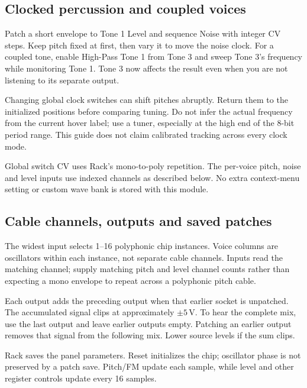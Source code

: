 \subsection{Clocked percussion and coupled voices}
Patch a short envelope to Tone 1 Level and sequence Noise with integer CV
steps. Keep pitch fixed at first, then vary it to move the noise clock.
For a coupled tone, enable High-Pass Tone 1 from Tone 3 and sweep Tone 3's
frequency while monitoring Tone 1. Tone 3 now affects the result even when
you are not listening to its separate output.

Changing global clock switches can shift pitches abruptly. Return them to
the initialized positions before comparing tuning. Do not infer the actual
frequency from the current hover label; use a tuner, especially at the
high end of the 8-bit period range. This guide does not claim calibrated
tracking across every clock mode.

Global switch CV uses Rack's mono-to-poly repetition. The per-voice pitch,
noise and level inputs use indexed channels as described below. No extra
context-menu setting or custom wave bank is stored with this module.

\subsection{Cable channels, outputs and saved patches}
The widest input selects 1--16 polyphonic chip instances. Voice columns are
oscillators within each instance, not separate cable channels. Inputs read
the matching channel; supply matching pitch and level channel counts rather
than expecting a mono envelope to repeat across a polyphonic pitch cable.

Each output adds the preceding output when that earlier socket is unpatched.
The accumulated signal clips at approximately $\pm5$\,V. To hear the complete
mix, use the last output and leave earlier outputs empty. Patching an earlier
output removes that signal from the following mix. Lower source levels if
the sum clips.

Rack saves the panel parameters. Reset initializes the chip; oscillator
phase is not preserved by a patch save. Pitch/FM update each sample, while
level and other register controls update every 16 samples.
